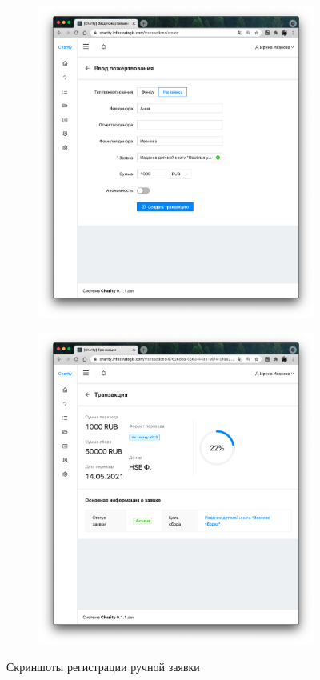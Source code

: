 \documentclass[a4paper,12pt,reqno]{article}
\begin{document}
	\begin{figure}[H]
	    \centering
		\begin{subfigure}[b]{0.475\linewidth}
			\includegraphics[width=\linewidth]{img/ro/donation_manual.png}
		\end{subfigure}
		\begin{subfigure}[b]{0.475\linewidth}
			\includegraphics[width=\linewidth]{img/ro/donation_from_fund.png}
		\end{subfigure}
		\caption{Скриншоты регистрации ручной заявки}
		\label{pic: manual_donation}
	\end{figure}
	
\end{document}
